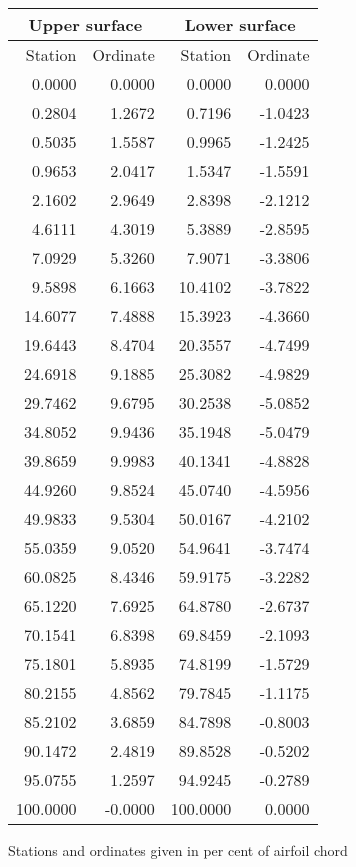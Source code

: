 \documentclass[11pt]{book}
\begin{document}
 \hspace{4mm}
 \begin{tabular}{|r|r|r|r|} \hline 
 \multicolumn{2}{|c|}{Upper surface} & \multicolumn{2}{|c|}{Lower surface} \\
 \hline
 Station & Ordinate & Station & Ordinate \\
 \hline
0.0000 & 0.0000 & 0.0000 & 0.0000 \\
0.2804 & 1.2672 & 0.7196 & -1.0423 \\
0.5035 & 1.5587 & 0.9965 & -1.2425 \\
0.9653 & 2.0417 & 1.5347 & -1.5591 \\
2.1602 & 2.9649 & 2.8398 & -2.1212 \\
4.6111 & 4.3019 & 5.3889 & -2.8595 \\
7.0929 & 5.3260 & 7.9071 & -3.3806 \\
9.5898 & 6.1663 & 10.4102 & -3.7822 \\
14.6077 & 7.4888 & 15.3923 & -4.3660 \\
19.6443 & 8.4704 & 20.3557 & -4.7499 \\
24.6918 & 9.1885 & 25.3082 & -4.9829 \\
29.7462 & 9.6795 & 30.2538 & -5.0852 \\
34.8052 & 9.9436 & 35.1948 & -5.0479 \\
39.8659 & 9.9983 & 40.1341 & -4.8828 \\
44.9260 & 9.8524 & 45.0740 & -4.5956 \\
49.9833 & 9.5304 & 50.0167 & -4.2102 \\
55.0359 & 9.0520 & 54.9641 & -3.7474 \\
60.0825 & 8.4346 & 59.9175 & -3.2282 \\
65.1220 & 7.6925 & 64.8780 & -2.6737 \\
70.1541 & 6.8398 & 69.8459 & -2.1093 \\
75.1801 & 5.8935 & 74.8199 & -1.5729 \\
80.2155 & 4.8562 & 79.7845 & -1.1175 \\
85.2102 & 3.6859 & 84.7898 & -0.8003 \\
90.1472 & 2.4819 & 89.8528 & -0.5202 \\
95.0755 & 1.2597 & 94.9245 & -0.2789 \\
100.0000 & -0.0000 & 100.0000 & 0.0000 \\
 \hline 
 \end{tabular}
 \vspace{8mm}

Stations and ordinates given in per cent of airfoil chord
\end{document}
